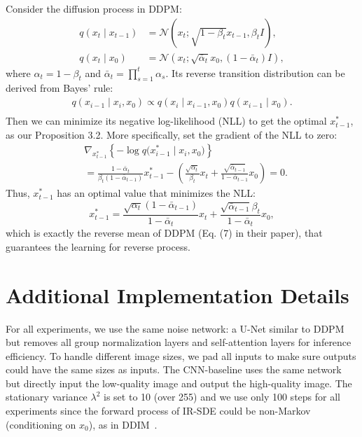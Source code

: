 \documentclass{article}
\theoremstyle{plain}
\theoremstyle{definition}
\theoremstyle{remark}
\begin{document}
Consider the diffusion process in DDPM:
\begin{equation}
    \begin{split}
        q(x_t \mid x_{t-1}) &= \mathcal{N}(x_t; \sqrt{1 - \beta_t} x_{t-1}, \beta_t I), \\
        q(x_t \mid x_0) &= \mathcal{N}(x_t; \sqrt{\bar{\alpha}_t} x_0, (1 - \bar{\alpha}_t) I),
    \end{split}
\end{equation}
where $\alpha_t = 1 - \beta_t$ and $\bar{\alpha}_t = \prod_{s=1}^t \alpha_s$. Its reverse transition distribution can be derived from Bayes' rule:
\begin{equation}
    \begin{split}
        q(x_{i-1} \mid x_i, x_0) \propto q(x_{i} \mid x_{i-1}, {x}_0) q(x_{{i-1}} \mid { x}_0). \\
    \end{split}
\end{equation}
Then we can minimize its negative log-likelihood (NLL) to get the optimal $x_{t-1}^*$, as our Proposition 3.2. More specifically, set the gradient of the NLL to zero:
\begin{equation}
    \begin{split}
        & \nabla_{x_{t-1}^{*}} \left\{-\log q \bigl(x_{i-1}^{*} \mid x_i, x_0 \bigr)\right\} \\
        & = \frac{1 - \bar{\alpha}_t}{\beta_t (1 - \bar{\alpha}_{t-1})} x_{t-1}^{*} - (\frac{\sqrt{\alpha_t}}{\beta_t} x_t + \frac{\sqrt{\bar{\alpha}_{t-1}}}{1 - \bar{\alpha}_{t-1}} x_0) = 0.
    \end{split}
\end{equation}
Thus, $x_{t-1}^{*}$ has an optimal value that minimizes the NLL:
\begin{equation}
    x_{t-1}^{*} = \frac{\sqrt{\alpha_t}(1 - \bar{\alpha}_{t-1})}{1 - \bar{\alpha}_t} x_t + \frac{\sqrt{\bar{\alpha}_{t-1}} \beta_t}{1 - \bar{\alpha}_t} x_0,
\end{equation}
which is exactly the reverse mean of DDPM (Eq. (7) in their paper), that guarantees the learning for reverse process.

\section{Additional Implementation Details}
\label{app-sec:implementation}
For all experiments, we use the same noise network: a U-Net similar to DDPM~\cite{chung2022diffusion} but removes all group normalization layers and self-attention layers for inference efficiency. To handle different image sizes, we pad all inputs to make sure outputs could have the same sizes as inputs. The CNN-baseline uses the same network but directly input the low-quality image and output the high-quality image.
The stationary variance $\lambda^2$ is set to 10 (over 255) and we use only 100 steps for all experiments since the forward process of IR-SDE could be non-Markov (conditioning on $x_0$), as in DDIM~\cite{song2021denoising}. 
\end{document}
